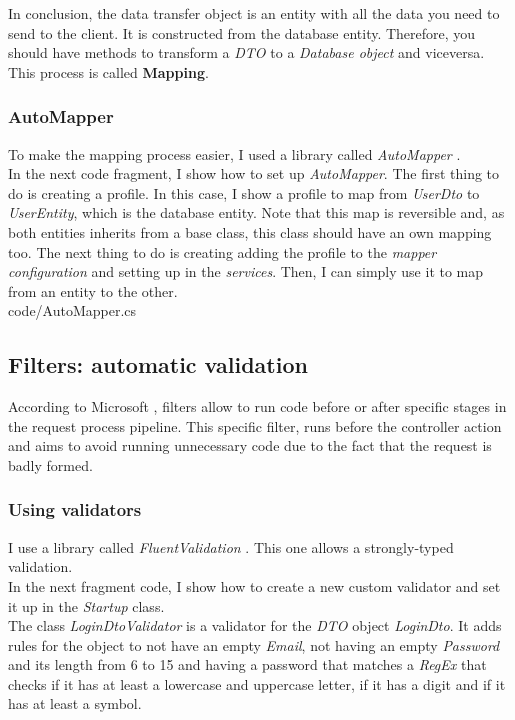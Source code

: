         In conclusion, the data transfer object is an entity with all the data you need to send to the client. It is constructed from the database entity. Therefore, you should have methods to transform a \textit{DTO} to a \textit{Database object} and viceversa. This process is called \textbf{Mapping}.

        \subsubsection{AutoMapper}
        To make the mapping process easier, I used a library called \textit{AutoMapper} \cite{AutoMapper}. \\

        In the next code fragment, I show how to set up \textit{AutoMapper}. The first thing to do is creating a profile. In this case, I show a profile to map from \textit{UserDto} to \textit{UserEntity}, which is the database entity. Note that this map is reversible and, as both entities inherits from a base class, this class should have an own mapping too. The next thing to do is creating adding the profile to the \textit{mapper configuration} and setting up in the \textit{services}. Then, I can simply use it to map from an entity to the other. \\
        
        {code/AutoMapper.cs}

    \subsection{Filters: automatic validation}
    According to Microsoft \cite{Filters}, filters allow to run code before or after specific stages in the request process pipeline. This specific filter, runs before the controller action and aims to avoid running unnecessary code due to the fact that the request is badly formed. \\

        \subsubsection{Using validators}
        I use a library called \textit{FluentValidation} \cite{FluentValidation}. This one allows a strongly-typed validation. \\

        In the next fragment code, I show how to create a new custom validator and set it up in the \textit{Startup} class. \\
        The class \textit{LoginDtoValidator} is a validator for the \textit{DTO} object \textit{LoginDto}. It adds rules for the object to not have an empty \textit{Email}, not having an empty \textit{Password} and its length from 6 to 15 and having a password that matches a \textit{RegEx} that checks if it has at least a lowercase and uppercase letter, if it has a digit and if it has at least a symbol. \\

